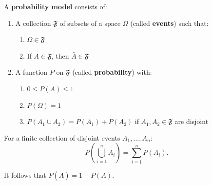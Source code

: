 A \textbf{probability model} consists of:
\begin{enumerate}
\item A collection $\mathfrak{F}$ of subsets of a space $\Omega$ (called \textbf{events}) such that:
  \begin{enumerate}
  \item $\Omega \in \mathfrak{F}$
  \item If $A \in \mathfrak{F}$, then $\bar{A} \in \mathfrak{F}$
  \end{enumerate}
\item A function $P$ on $\mathfrak{F}$ (called \textbf{probability}) with:
  \begin{enumerate}
  \item $0 \leq P(A) \leq 1$
  \item $P(\Omega) = 1$
  \item $P(A_1 \cup A_2) = P(A_1) + P(A_2)$ if $A_1, A_2 \in \mathfrak{F}$ are disjoint
  \end{enumerate}
\end{enumerate}

For a finite collection of disjoint events $A_1, \dots, A_n$:
$$P\left(\bigcup_{i=1}^{n} A_i\right) = \sum_{i=1}^{n} P(A_i).$$

It follows that $P(\bar{A}) = 1 - P(A)$.
